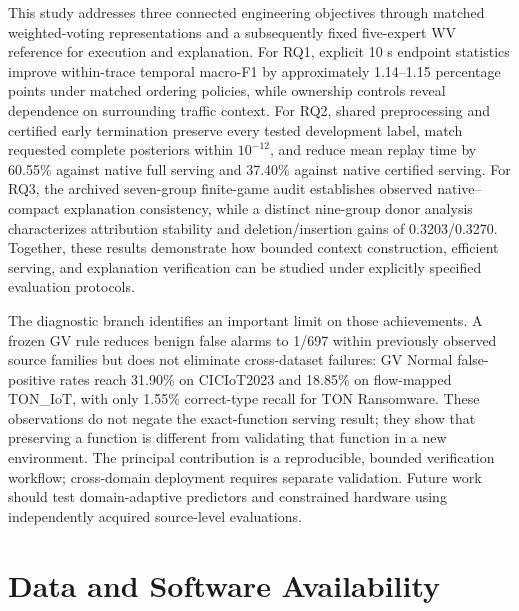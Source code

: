 \documentclass[final,3p,10pt,nopreprintline]{elsarticle}
\begin{document}
This study addresses three connected engineering objectives through matched weighted-voting representations and a subsequently fixed five-expert WV reference for execution and explanation. For RQ1, explicit 10 s endpoint statistics improve within-trace temporal macro-F1 by approximately 1.14--1.15 percentage points under matched ordering policies, while ownership controls reveal dependence on surrounding traffic context. For RQ2, shared preprocessing and certified early termination preserve every tested development label, match requested complete posteriors within \(10^{-12}\), and reduce mean replay time by 60.55\% against native full serving and 37.40\% against native certified serving. For RQ3, the archived seven-group finite-game audit establishes observed native--compact explanation consistency, while a distinct nine-group donor analysis characterizes attribution stability and deletion/insertion gains of 0.3203/0.3270. Together, these results demonstrate how bounded context construction, efficient serving, and explanation verification can be studied under explicitly specified evaluation protocols.

The diagnostic branch identifies an important limit on those achievements. A frozen GV rule reduces benign false alarms to 1/697 within previously observed source families but does not eliminate cross-dataset failures: GV Normal false-positive rates reach 31.90\% on CICIoT2023 and 18.85\% on flow-mapped TON\_IoT, with only 1.55\% correct-type recall for TON Ransomware. These observations do not negate the exact-function serving result; they show that preserving a function is different from validating that function in a new environment. The principal contribution is a reproducible, bounded verification workflow; cross-domain deployment requires separate validation. Future work should test domain-adaptive predictors and constrained hardware using independently acquired source-level evaluations.

\section*{Data and Software Availability}
\end{document}
